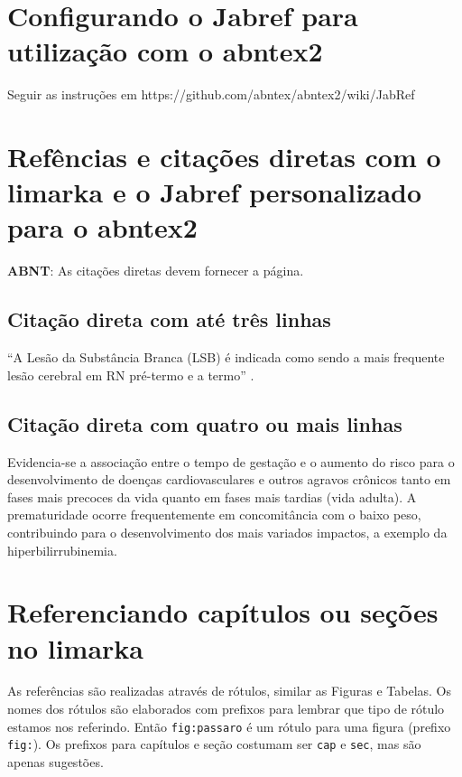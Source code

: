 \documentclass[
	12pt,				%
  openright,			%
	twoside,			%
	a4paper,			%
	english,			%
	french,				%
	spanish,			%
	brazil				%
	]{abntex2}
\renewenvironment{quote}
  {\small\list{}{\rightmargin=0.1cm \leftmargin=4cm}%
   \item\relax}
  {\endlist}
\begin{document}
\chapter{Configurando o Jabref para utilização com o
abntex2}\label{configurando-o-jabref-para-utilizauxe7uxe3o-com-o-abntex2}

Seguir as instruções em https://github.com/abntex/abntex2/wiki/JabRef

\chapter{Refências e citações diretas com o limarka e o Jabref
personalizado para o abntex2}\label{capitulo:citacoes}

\textbf{ABNT}: As citações diretas devem fornecer a página.

\section{Citação direta com até três
linhas}\label{secao:citacao-indireta}

``A Lesão da Substância Branca (LSB) é indicada como sendo a mais
frequente lesão cerebral em RN pré-termo e a termo''
\cite[p. 7]{almeida2013}.

\section{Citação direta com quatro ou mais
linhas}\label{secao:citacao-direta}

\begin{quote}
Evidencia-se a associação entre o tempo de gestação e o aumento do risco
para o desenvolvimento de doenças cardiovasculares e outros agravos
crônicos tanto em fases mais precoces da vida quanto em fases mais
tardias (vida adulta). A prematuridade ocorre frequentemente em
concomitância com o baixo peso, contribuindo para o desenvolvimento dos
mais variados impactos, a exemplo da hiperbilirrubinemia.
\cite[p. 7]{almeida2013}
\end{quote}

\chapter{Referenciando capítulos ou seções no
limarka}\label{cap:rotulos}

As referências são realizadas através de rótulos, similar as Figuras e
Tabelas. Os nomes dos rótulos são elaborados com prefixos para lembrar
que tipo de rótulo estamos nos referindo. Então \texttt{fig:passaro} é
um rótulo para uma figura (prefixo \texttt{fig:}). Os prefixos para
capítulos e seção costumam ser \texttt{cap} e \texttt{sec}, mas são
apenas sugestões.
\end{document}
